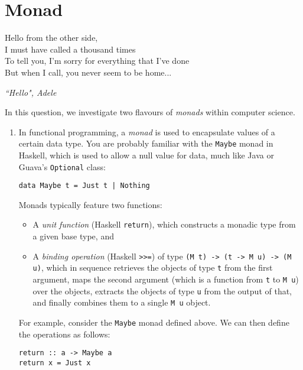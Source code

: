 \documentclass[12pt, a4paper]{article}
\begin{document}
\begin{enumerate}
\end{enumerate}

\newpage

\section{Monad}
\epigraph{Hello from the other side, \\
I must have called a thousand times \\
To tell you, I'm sorry for everything that I've done \\
But when I call, you never seem to be home...
}{\textit{``Hello", Adele}}

\noindent In this question, we investigate two flavours of \textit{monads} within computer science.

\begin{enumerate}
\item In functional programming, a \textit{monad} is used to encapsulate values of a certain data type. You are probably familiar with the \texttt{Maybe} monad in Haskell, which is used to allow a null value for data, much like Java or Guava's \texttt{Optional} class:

\begin{lstlisting}
data Maybe t = Just t | Nothing
\end{lstlisting}

Monads typically feature two functions:
\begin{itemize}
\item A \textit{unit function} (Haskell \texttt{return}), which constructs a monadic type from a given base type, and
\item A \textit{binding operation} (Haskell \texttt{>>=}) of type \texttt{(M t) -> (t -> M u) -> (M u)}, which in sequence retrieves the objects of type \texttt{t} from the first argument, maps the second argument (which is a function from \texttt{t} to \texttt{M u}) over the objects, extracts the objects of type \texttt{u} from the output of that, and finally combines them to a single \texttt{M u} object.
\end{itemize}

For example, consider the \texttt{Maybe} monad defined above. We can then define the operations as follows:

\lstset{
  language = Haskell,
  basicstyle = \ttfamily \small,
  numbers = left,
  numberstyle = \footnotesize,
  showstringspaces = false
}
\begin{lstlisting}
return :: a -> Maybe a
return x = Just x


\end{lstlisting}
\end{enumerate}
\end{document}
